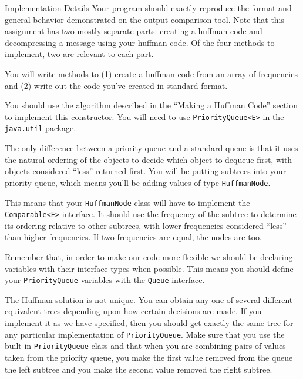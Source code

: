 \documentclass[programming]{../../mfcs}
\begin{document}
\begin{question}{Implementation Details}
Your program should exactly reproduce the format and general behavior demonstrated on the
output comparison tool. Note that this assignment has two mostly separate parts: creating a
huffman code and decompressing a message using your huffman code.  Of the four methods to
implement, two are relevant to each part.

\vspace{0.5em}

You will write methods to (1) create a huffman code from an array of frequencies and (2)
write out the code you've created in standard format.

You should use the algorithm described in the ``Making a Huffman Code'' section to implement
this constructor.  You will need to use \texttt{PriorityQueue<E>} in the \texttt{java.util}
package.

\vspace{0.5em}

The only difference between a priority queue and a standard queue is that it uses the
natural ordering of the objects to decide which object to dequeue first, with objects
considered ``less'' returned first.  You will be putting subtrees into your priority queue,
which means you'll be adding values of type \texttt{HuffmanNode}.

\vspace{0.5em}

This means that your \texttt{HuffmanNode} class will have to implement the
\texttt{Comparable<E>} interface.  It should use the frequency of the subtree to determine
its ordering relative to other subtrees, with lower frequencies considered ``less'' than
higher frequencies.  If two frequencies are equal, the nodes are too.

\vspace{0.5em}

Remember that, in order to make our code more flexible we should be declaring variables with
their interface types when possible. This means you should define your \texttt{PriorityQueue} variables with
the \texttt{Queue} interface.

\vspace{0.5em}

The Huffman solution is not unique.  You can obtain any one of several different equivalent
trees depending upon how certain decisions are made.  If you implement it as we have
specified, then you should get exactly the same tree for any particular implementation
of \texttt{PriorityQueue}.  Make sure that you use the built-in \texttt{PriorityQueue} class
and that when you are combining pairs of values taken from the priority queue, you make the
first value removed from the queue the left subtree and you make the second value removed
the right subtree.


\end{question}
\end{document}
